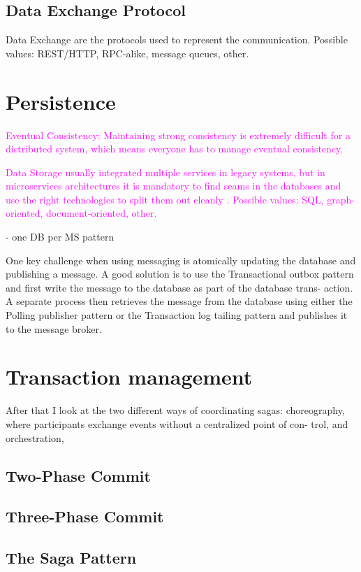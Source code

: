 \documentclass[thesis=M,english,hidelinks]{FITthesis}[2012/10/20]
\begin{document}
\subsection{Data Exchange Protocol}
Data Exchange are the protocols used to represent the communication. Possible values: REST/HTTP, RPC-alike, message queues, other.

% 
% 
\section{Persistence}

\textcolor{magenta}{Eventual Consistency: Maintaining strong consistency is extremely difficult for a distributed system, which means everyone has to manage eventual consistency.}

\textcolor{magenta}{Data Storage usually integrated multiple services in legacy systems, but in microservices architectures it is mandatory to find seams in the databases and use the right technologies to split them out cleanly \cite{ms-building-ms}. Possible values: SQL, graph-oriented, document-oriented, other.}

- one DB per MS pattern 

One key challenge when using messaging is atomically updating the database and publishing a message. A good solution is to use the Transactional outbox pattern and first write the message to the database as part of the database trans- action. A separate process then retrieves the message from the database using either the Polling publisher pattern or the Transaction log tailing pattern and publishes it to the message broker.

% 
% 
\section{Transaction management}
\label{sec:transaction_management}
After that I look at the two different ways of coordinating sagas: choreography, where participants exchange events without a centralized point of con- trol, and orchestration, 

\subsection{Two-Phase Commit}
\subsection{Three-Phase Commit}
\subsection{The Saga Pattern}
\end{document}
